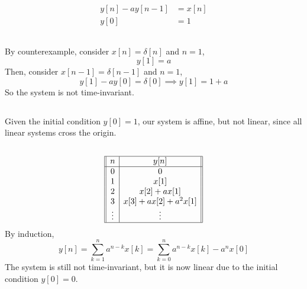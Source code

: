 \documentclass{article}
\begin{document}
\newpage
\section{}

\begin{align}
    y[n] - ay[n - 1] &= x[n] \\
    y[0] &= 1
\end{align}

\subsection{}

By counterexample, consider \(x[n] = \delta[n]\) and \(n = 1\),
\begin{equation}
    y[1] = a
\end{equation}
Then, consider \(x[n - 1] = \delta[n - 1]\) and \(n = 1\),
\begin{equation}
    y[1] - a y[0] = \delta[0] \implies y[1] = 1 + a
\end{equation}
So the system is not time-invariant.

\subsection{}

Given the initial condition \(y[0] = 1\), our system is affine, but not linear, since all linear systems cross the origin.

\subsection{}

\begin{equation}
    \begin{array}[]{||c|c||}
        \hline
        n & y[n] \\
        \hline
        0 & 0 \\
        1 & x[1] \\
        2 & x[2] + a x[1] \\
        3 & x[3] + a x[2] + a^2 x[1] \\
        \vdots & \vdots \\
        \hline
    \end{array}
\end{equation}
By induction,
\begin{equation}
    y[n] = \sum_{k = 1}^n a^{n - k} x[k] = \sum_{k = 0}^n a^{n - k} x[k] - a^n x[0]
\end{equation}
The system is still not time-invariant, but it is now linear due to the initial condition \(y[0] = 0\).
\end{document}
